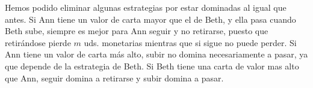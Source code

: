 \documentclass[12pt,a4paper,]{book}
\numberwithin{dummy}{section}
\theoremstyle{ocrenumbox}
\theoremstyle{blacknumex}
\theoremstyle{blacknumbox}
\theoremstyle{ocrenum}
\theoremstyle{ocrenum}
\begin{document}
Hemos podido eliminar algunas estrategias por estar dominadas al igual
que antes. Si Ann tiene un valor de carta mayor que el de Beth, y ella
pasa cuando Beth sube, siempre es mejor para Ann seguir y no retirarse,
puesto que retirándose pierde \(m\) uds. monetarias mientras que si
sigue no puede perder. Si Ann tiene un valor de carta más alto, subir no
domina necesariamente a pasar, ya que depende de la estrategia de Beth.
Si Beth tiene una carta de valor mas alto que Ann, seguir domina a
retirarse y subir domina a pasar.




%
\end{document}

